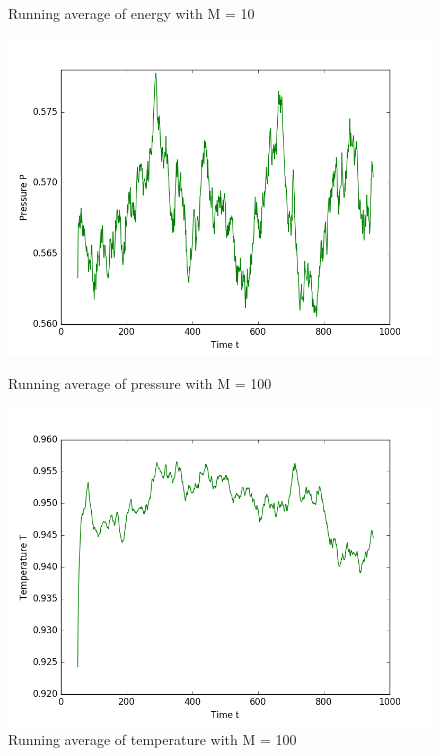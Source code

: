 \begin{figure}[h]
  \caption{Running average of energy with M = 10}\label{fig:energy1}
\endminipage
\end{figure}
\begin{figure}[h]
  \includegraphics[width=\linewidth]{fig/avPressure_M100.png}
  \caption{Running average of pressure with M = 100}\label{fig:pres2}
\endminipage\hfill
{}
  \includegraphics[width=\linewidth]{fig/avTemperature_M100.png}
  \caption{Running average of temperature with M = 100}\label{fig:temp2}
\endminipage\hfill
{}

\end{figure}
